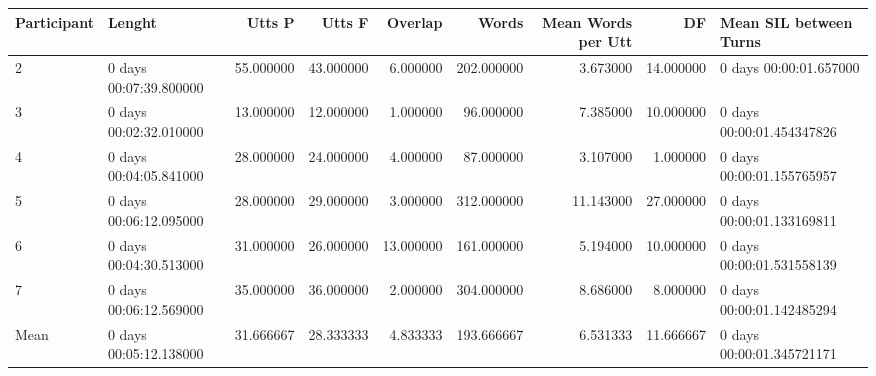 \begin{tabular}{llrrrrrrl}
\toprule
Participant & Lenght & Utts P  & Utts F & Overlap & Words & Mean Words per Utt & DF & Mean SIL between Turns \\
\midrule
2 & 0 days 00:07:39.800000 & 55.000000 & 43.000000 & 6.000000 & 202.000000 & 3.673000 & 14.000000 & 0 days 00:00:01.657000 \\
3 & 0 days 00:02:32.010000 & 13.000000 & 12.000000 & 1.000000 & 96.000000 & 7.385000 & 10.000000 & 0 days 00:00:01.454347826 \\
4 & 0 days 00:04:05.841000 & 28.000000 & 24.000000 & 4.000000 & 87.000000 & 3.107000 & 1.000000 & 0 days 00:00:01.155765957 \\
5 & 0 days 00:06:12.095000 & 28.000000 & 29.000000 & 3.000000 & 312.000000 & 11.143000 & 27.000000 & 0 days 00:00:01.133169811 \\
6 & 0 days 00:04:30.513000 & 31.000000 & 26.000000 & 13.000000 & 161.000000 & 5.194000 & 10.000000 & 0 days 00:00:01.531558139 \\
7 & 0 days 00:06:12.569000 & 35.000000 & 36.000000 & 2.000000 & 304.000000 & 8.686000 & 8.000000 & 0 days 00:00:01.142485294 \\
Mean & 0 days 00:05:12.138000 & 31.666667 & 28.333333 & 4.833333 & 193.666667 & 6.531333 & 11.666667 & 0 days 00:00:01.345721171 \\
\bottomrule
\end{tabular}
